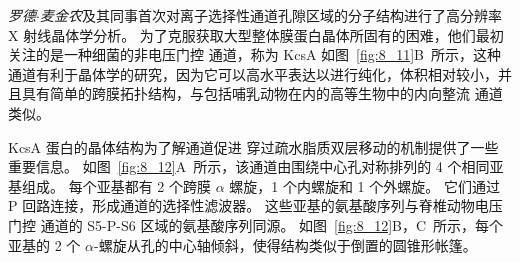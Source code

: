 \textit{罗德$\cdot$麦金农}及其同事首次对离子选择性通道孔隙区域的分子结构进行了高分辨率 X 射线晶体学分析。
为了克服获取大型整体膜蛋白晶体所固有的困难，他们最初关注的是一种细菌的非电压门控  通道，称为 KcsA
如图~\ref{fig:8_11}B~所示，这种通道有利于晶体学的研究，因为它可以高水平表达以进行纯化，体积相对较小，并且具有简单的跨膜拓扑结构，与包括哺乳动物在内的高等生物中的内向整流 通道类似。


KcsA 蛋白的晶体结构为了解通道促进  穿过疏水脂质双层移动的机制提供了一些重要信息。
如图~\ref{fig:8_12}A~所示，该通道由围绕中心孔对称排列的 4 个相同亚基组成。
每个亚基都有 2 个跨膜 $\alpha$ 螺旋，1 个内螺旋和 1 个外螺旋。
它们通过 P 回路连接，形成通道的选择性滤波器。
这些亚基的氨基酸序列与脊椎动物电压门控  通道的 S5-P-S6 区域的氨基酸序列同源。
如图~\ref{fig:8_12}B，C~所示，每个亚基的 2 个 $\alpha$-螺旋从孔的中心轴倾斜，使得结构类似于倒置的圆锥形帐篷。


